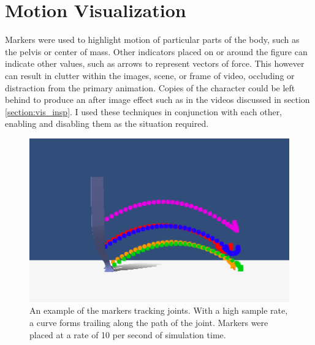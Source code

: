 \section{Motion Visualization}
\label{section:motion_vis}

Markers were used to highlight motion of particular parts of the body, such as the pelvis or center of mass.  Other indicators placed on or around the figure can indicate other values, such as arrows to represent vectors of force.  This however can result in clutter within the images, scene, or frame of video, occluding or distraction from the primary animation.  Copies of the character could be left behind to produce an after image effect such as in the videos discussed in section \ref{section:vis_insp}.  I used these techniques in conjunction with each other, enabling and disabling them as the situation required.


\begin{figure}[ht]
	\centering
	\includegraphics[width=\textwidth]{images/trails/trail-side.png}
	\caption[Marker trail visualization of motion]{An example of the markers tracking joints.  With a high sample rate, a curve forms trailing along the path of the joint.  Markers were placed at a rate of 10 per second of simulation time.}
	\label{fig:marker_trails}
\end{figure}

